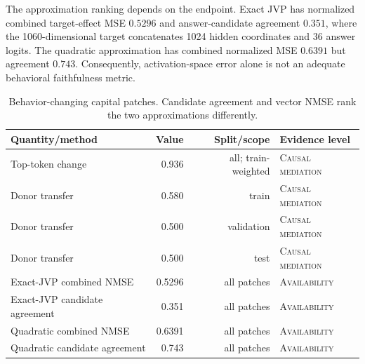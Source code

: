\documentclass[10pt]{article}
\newcommand{\level}[1]{{\scriptsize\textsc{#1}}}
\begin{document}
The approximation ranking depends on the endpoint.  Exact JVP has normalized
combined target-effect MSE $0.5296$ and answer-candidate agreement $0.351$,
where the 1060-dimensional target concatenates 1024 hidden coordinates and 36
answer logits.  The quadratic approximation has combined normalized MSE
$0.6391$ but agreement $0.743$.
Consequently, activation-space error alone is not an adequate behavioral
faithfulness metric.

\begin{table}[t]
\centering
\small
\caption{Behavior-changing capital patches.  Candidate agreement and vector
NMSE rank the two approximations differently.}
\label{tab:capital}
\begin{tabular}{@{}lrrl@{}}
\toprule
Quantity/method & Value & Split/scope & Evidence level \\
\midrule
Top-token change & 0.936 & all; train-weighted & \level{Causal mediation} \\
Donor transfer & 0.580 & train & \level{Causal mediation} \\
Donor transfer & 0.500 & validation & \level{Causal mediation} \\
Donor transfer & 0.500 & test & \level{Causal mediation} \\
Exact-JVP combined NMSE & 0.5296 & all patches & \level{Availability} \\
Exact-JVP candidate agreement & 0.351 & all patches & \level{Availability} \\
Quadratic combined NMSE & 0.6391 & all patches & \level{Availability} \\
Quadratic candidate agreement & 0.743 & all patches & \level{Availability} \\
\bottomrule
\end{tabular}
\end{table}
\end{document}
